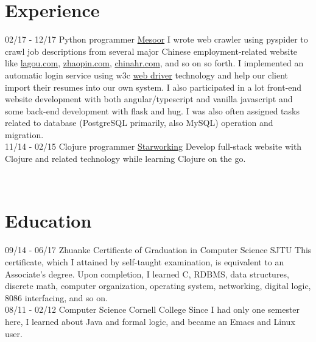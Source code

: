\documentclass[a4paper]{friggeri-cv}
\begin{document}
\section{Experience}
\begin{entrylist}
  \entry
  {02/17 - 12/17}
  {Python programmer}
  {\href{https://www.mesoor.com/}{Mesoor}}
  {I wrote web crawler using pyspider to crawl job descriptions from several major Chinese employment-related website like \href{https://www.lagou.com/}{lagou.com}, \href{https://www.zhaopin.com/}{zhaopin.com}, \href{http://www.chinahr.com/}{chinahr.com}, and so on so forth.  I implemented an automatic login service using w3c \href{https://github.com/w3c/web-platform-tests/pull/6743}{web driver} technology and help our client import their resumes into our own system.  I also participated in a lot front-end website development with both angular/typescript and vanilla javascript and some back-end development with flask and hug.  I was also often assigned tasks related to database (PostgreSQL primarily, also MySQL) operation and migration.  \\}
  \entry
  {11/14 - 02/15}
  {Clojure programmer}
  {\href{http://www.starworking.com/}{Starworking}}
  {Develop full-stack website with Clojure and related technology while learning Clojure on the go.}
\end{entrylist}
\\
\section{Education}
\begin{entrylist}
  \entry
  {09/14 - 06/17}
  {Zhuanke Certificate of Graduation in Computer Science}
  {SJTU}
  {This certificate, which I attained by self-taught examination, is equivalent to an Associate's degree.  Upon completion, I learned C, RDBMS, data structures, discrete math, computer organization, operating system, networking, digital logic, 8086 interfacing, and so on.\\}
  \entry
  {08/11 - 02/12}
  {Computer Science}
  {Cornell College}
  {Since I had only one semester here, I learned about Java and formal logic, and became an Emacs and Linux user.}
\end{entrylist}

\end{document}
